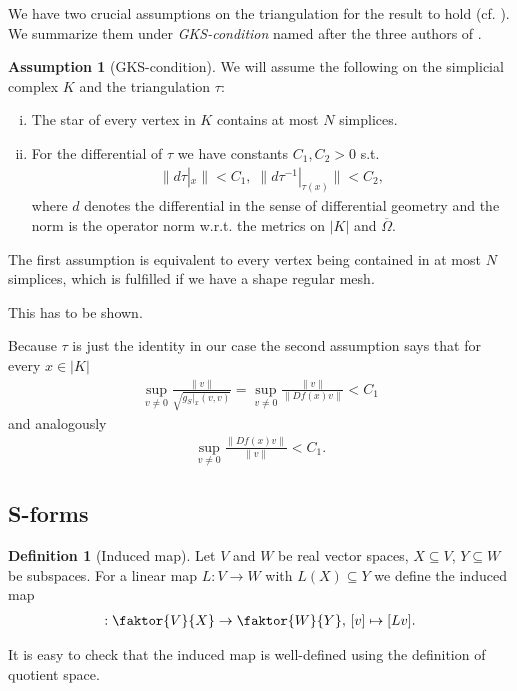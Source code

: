 \documentclass[12pt,a4paper]{article}
\numberwithin{equation}{subsection}
\numberwithin{lemma}{subsection}
\theoremstyle{definition}
\newtheorem{assumption}[lemma]{Assumption}
\newtheorem{definition}[lemma]{Definition}
\newcommand{\omegabar}{\overline{\Omega}}
\begin{document}
We have two crucial assumptions on the triangulation for the result to hold 
(cf. \cite[p.194]{goldshtein}). We summarize them under 
\textit{GKS-condition} named after the three authors of \cite{goldshtein}.

\begin{assumption}[GKS-condition] \label{ass:gks_condition}
    We will assume the following on the simplicial complex $K$ 
    and the triangulation $\tau$:
    \begin{enumerate}[(i)]
    \item The star of every vertex in $K$ contains at most $N$ simplices.
    \item For the differential of $\tau$ we have constants 
        $C_1, C_2 > 0$ s.t.
        \begin{align*}
        \lVert d\tau|_x \rVert < C_1, \; 
        \lVert d\tau^{-1}|_{\tau(x)} \rVert < C_2,
        \end{align*}
        where $d$ denotes the differential in the sense of differential 
        geometry and the norm is the operator norm w.r.t. the metrics on $|K|$ 
        and $\omegabar$.
    \end{enumerate}
\end{assumption}
The first assumption is equivalent to every vertex being contained in
at most $N$ simplices, which is fulfilled if we have a shape regular mesh.\par
{\color{red} This has to be shown.}

Because $\tau$ is just the identity in our case 
the second assumption says that for every 
$x \in |K|$
\begin{align*}
\sup\limits_{v \neq 0} \frac{\lVert v \rVert}{\sqrt{g_S|_x(v,v)}} =
\sup\limits_{v \neq 0} \frac{\lVert v \rVert}{\lVert Df(x)v\rVert} < C_1
\end{align*}
and analogously
\begin{align*}
    \sup\limits_{v \neq 0} \frac{\lVert Df(x)v\rVert}{\lVert v \rVert} < C_1.
\end{align*}

\subsection{S-forms}
\begin{definition}[Induced map]
    Let $V$ and $W$ be real vector spaces, $X \subseteq V$, $Y \subseteq W$ be 
    subspaces. For a linear map $L: V \rightarrow W$ with $L(X) \subseteq Y$ 
    we define the induced map
    \begin{align*}
        [L]: \faktor{V}{X} \rightarrow \faktor{W}{Y},\,
        [v] \mapsto [Lv].
    \end{align*}     
\end{definition}
It is easy to check that the induced map is well-defined using the
definition of quotient space. %
\end{document}
